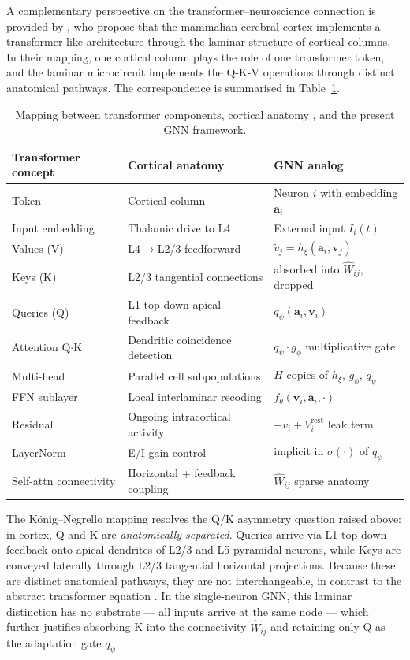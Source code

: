 \documentclass[11pt]{article}
\begin{document}
A complementary perspective on the transformer--neuroscience connection is
provided by \citet{konig2026}, who propose that the mammalian cerebral cortex
implements a transformer-like architecture through the laminar structure of
cortical columns. In their mapping, one cortical column plays the role of one
transformer token, and the laminar microcircuit implements the Q-K-V
operations through distinct anatomical pathways. The correspondence is
summarised in Table~\ref{tab:konig}.

\begin{table}[h]
\centering
\begin{tabular}{lll}
\toprule
Transformer concept & Cortical anatomy \citep{konig2026} & GNN analog \\
\midrule
Token & Cortical column & Neuron $i$ with embedding $\mathbf{a}_i$ \\
Input embedding & Thalamic drive to L4 & External input $I_i(t)$ \\
Values (V) & L4$\to$L2/3 feedforward & $\tilde{v}_j = h_\xi(\mathbf{a}_i, \mathbf{v}_j)$ \\
Keys (K) & L2/3 tangential connections & absorbed into $\hat{W}_{ij}$, dropped \\
Queries (Q) & L1 top-down apical feedback & $q_\psi(\mathbf{a}_i, \mathbf{v}_i)$ \\
Attention Q$\cdot$K & Dendritic coincidence detection & $q_\psi \cdot g_\phi$ multiplicative gate \\
Multi-head & Parallel cell subpopulations & $H$ copies of $h_\xi$, $g_\phi$, $q_\psi$ \\
FFN sublayer & Local interlaminar recoding & $f_\theta(\mathbf{v}_i, \mathbf{a}_i, \cdot)$ \\
Residual & Ongoing intracortical activity & $-v_i + V_i^{\text{rest}}$ leak term \\
LayerNorm & E/I gain control & implicit in $\sigma(\cdot)$ of $q_\psi$ \\
Self-attn connectivity & Horizontal + feedback coupling & $\hat{W}_{ij}$ sparse anatomy \\
\bottomrule
\end{tabular}
\caption{Mapping between transformer components, cortical anatomy
\citep{konig2026}, and the present GNN framework.}
\label{tab:konig}
\end{table}

The K\"{o}nig--Negrello mapping resolves the Q/K asymmetry question
raised above: in cortex, Q and K are \emph{anatomically separated}. Queries
arrive via L1 top-down feedback onto apical dendrites of L2/3 and L5
pyramidal neurons, while Keys are conveyed laterally through L2/3 tangential
horizontal projections. Because these are distinct anatomical pathways,
they are not interchangeable, in contrast to the abstract transformer
equation \citep{konig2026}. In the single-neuron GNN, this laminar
distinction has no substrate --- all inputs arrive at the same node --- which
further justifies absorbing K into the connectivity $\hat{W}_{ij}$ and
retaining only Q as the adaptation gate $q_\psi$.
\end{document}
